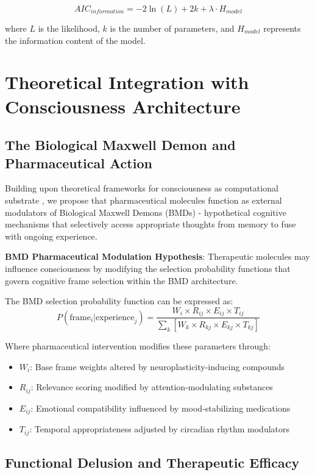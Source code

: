 \documentclass[12pt,a4paper]{article}
\begin{document}
$$AIC_{information} = -2 \ln(L) + 2k + \lambda \cdot H_{model}$$

where $L$ is the likelihood, $k$ is the number of parameters, and $H_{model}$ represents the information content of the model.

\section{Theoretical Integration with Consciousness Architecture}

\subsection{The Biological Maxwell Demon and Pharmaceutical Action}

Building upon theoretical frameworks for consciousness as computational substrate \citep{github_implementations}, we propose that pharmaceutical molecules function as external modulators of Biological Maxwell Demons (BMDs) - hypothetical cognitive mechanisms that selectively access appropriate thoughts from memory to fuse with ongoing experience.

\textbf{BMD Pharmaceutical Modulation Hypothesis}: Therapeutic molecules may influence consciousness by modifying the selection probability functions that govern cognitive frame selection within the BMD architecture.

The BMD selection probability function can be expressed as:
$$P(\text{frame}_i | \text{experience}_j) = \frac{W_i \times R_{ij} \times E_{ij} \times T_{ij}}{\sum_k[W_k \times R_{kj} \times E_{kj} \times T_{kj}]}$$

Where pharmaceutical intervention modifies these parameters through:
\begin{itemize}
\item $W_i$: Base frame weights altered by neuroplasticity-inducing compounds
\item $R_{ij}$: Relevance scoring modified by attention-modulating substances
\item $E_{ij}$: Emotional compatibility influenced by mood-stabilizing medications
\item $T_{ij}$: Temporal appropriateness adjusted by circadian rhythm modulators
\end{itemize}

\subsection{Functional Delusion and Therapeutic Efficacy}
\end{document}
